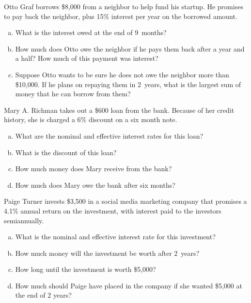\documentclass[11pt,letterpaper]{article}
\begin{document}

 Otto Graf borrows \$8,000 from a neighbor to help fund his startup. He promises to pay back the neighbor, plus 15\% interest per year on the borrowed amount. 
\begin{enumerate}[(a)]
\item What is the interest owed at the end of 9~months?
\item How much does Otto owe the neighbor if he pays them back after a year and a half? How much of this payment was interest?
\item Suppose Otto wants to be sure he does not owe the neighbor more than \$10,000. If he plans on repaying them in 2~years, what is the largest sum of money that he can borrow from them? 
\end{enumerate}





\newpage





 Mary A. Richman takes out a \$600 loan from the bank. Because of her credit history, she is charged a 6\% discount on a six month note. 
\begin{enumerate}[(a)]
\item What are the nominal and effective interest rates for this loan?
\item What is the discount of this loan?
\item How much money does Mary receive from the bank?
\item How much does Mary owe the bank after six months?
\end{enumerate}





\newpage





 Paige Turner invests \$3,500 in a social media marketing company that promises a 4.1\% annual return on the investment, with interest paid to the investors semiannually. 
\begin{enumerate}[(a)]
\item What is the nominal and effective interest rate for this investment?
\item How much money will the investment be worth after 2~years?
\item How long until the investment is worth \$5,000?
\item How much should Paige have placed in the company if she wanted \$5,000 at the end of 2 years? 
\end{enumerate}
\end{document}
